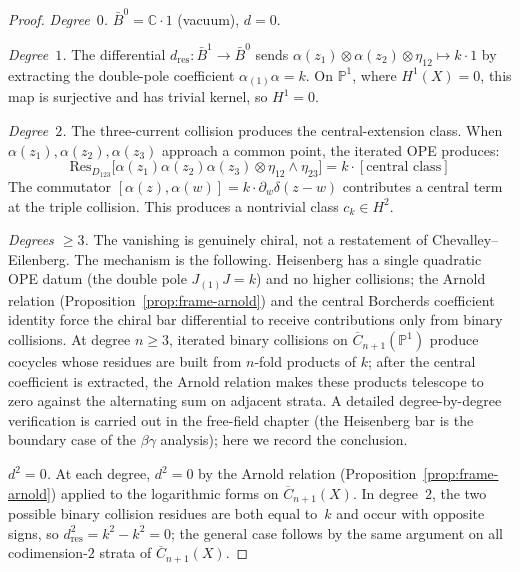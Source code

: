 \begin{proof}
\emph{Degree~$0$.}
$\bar{B}^0 = \mathbb{C} \cdot 1$ (vacuum), $d = 0$.

\emph{Degree~$1$.}
The differential $d_{\mathrm{res}}\colon \bar{B}^1 \to \bar{B}^0$
sends $\alpha(z_1) \otimes \alpha(z_2) \otimes \eta_{12} \mapsto k \cdot 1$
by extracting the double-pole coefficient
$\alpha_{(1)}\alpha=k$.
On $\mathbb{P}^1$, where $H^1(X) = 0$, this map is surjective
and has trivial kernel, so $H^1 = 0$.

\emph{Degree~$2$.}
The three-current collision produces the central-extension class.
When $\alpha(z_1), \alpha(z_2), \alpha(z_3)$ approach a
common point, the iterated OPE produces:
\begin{equation}\label{eq:frame-triple-residue}
\mathrm{Res}_{D_{123}}\bigl[\alpha(z_1)\alpha(z_2)\alpha(z_3)
\otimes \eta_{12} \wedge \eta_{23}\bigr]
= k \cdot [\text{central class}]
\end{equation}
The commutator $[\alpha(z), \alpha(w)] = k \cdot
\partial_w\delta(z-w)$ contributes a central term at
the triple collision. This produces a nontrivial
class $c_k \in H^2$.

\emph{Degrees $\geq 3$.}
The vanishing is genuinely chiral, not a restatement of
Chevalley--Eilenberg. The mechanism is the
following. Heisenberg has a single quadratic OPE datum
(the double pole $J_{(1)}J = k$) and no higher collisions;
the Arnold relation (Proposition~\ref{prop:frame-arnold})
and the central Borcherds coefficient identity force the chiral bar
differential to receive contributions only from binary collisions. At
degree $n\ge 3$, iterated
binary collisions on $\overline{C}_{n+1}(\mathbb{P}^1)$ produce
cocycles whose residues are built from $n$-fold products of
$k$; after the central coefficient is extracted, the Arnold relation
makes these products telescope to zero against the alternating sum on
adjacent strata. A detailed
degree-by-degree verification is carried out in the free-field
chapter (the Heisenberg bar is the boundary case of the
$\beta\gamma$ analysis); here we record the conclusion.

\emph{$d^2 = 0$.}
At each degree, $d^2 = 0$ by the Arnold relation
(Proposition~\ref{prop:frame-arnold}) applied to the
logarithmic forms on $\overline{C}_{n+1}(X)$.
In degree~$2$, the two possible binary collision residues are both
equal to~$k$ and occur with opposite signs, so
$d_{\mathrm{res}}^2=k^2-k^2=0$; the general case follows by the same
argument on all codimension-$2$ strata of $\overline{C}_{n+1}(X)$.
\end{proof}


